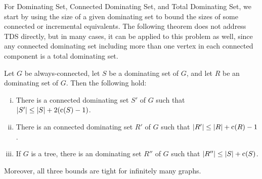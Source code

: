 For Dominating Set, Connected Dominating Set, and Total Dominating
Set, we start by using the size of a given dominating set to bound the
sizes of some connected or incremental equivalents. 
The following theorem does not address TDS directly, but in many
cases, it can be applied to this problem as well, since any connected
dominating set including more than one vertex in each connected
component is a total dominating set.

\begin{theorem}
\label{thm:cds}
Let $G$ be always-connected,
let $S$ be a dominating set of $G$,
and let $R$ be an \incr dominating set of $G$.
Then the following hold:
\begin{enumerate}[(i)]
\item \label{thm:cds:c} There is a connected dominating set $S'$ of $G$
such that  $|S'| \le |S| + 2(\mathrm{c}(S)-1)$.
\item \label{thm:cds:ic} There is an 
\incr connected dominating set $R'$
of $G$ such that $|R'| \le |R| + \mathrm{c}(R) -1$. 
\item \label{thm:cds:i} If $G$ is a tree, there is an \incr
dominating set $R''$ of $G$ such that $|R''| \le |S| + \mathrm{c}(S)$.
\end{enumerate}
Moreover, all three bounds are tight for infinitely many graphs.
\end{theorem}
